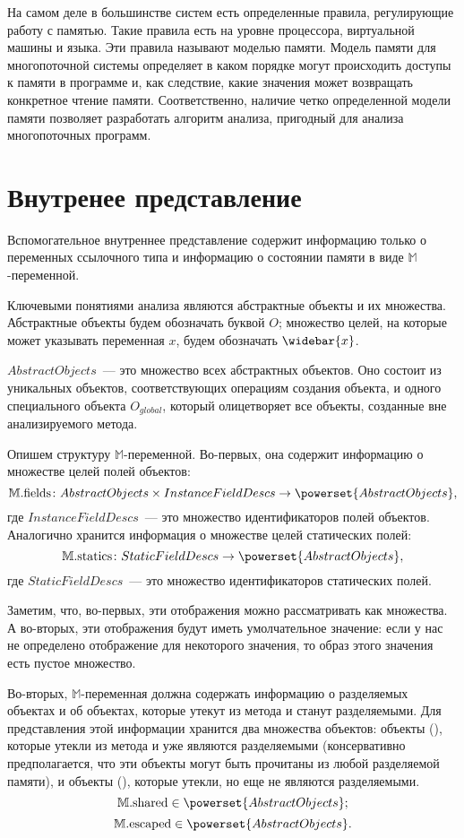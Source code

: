 \documentclass[14pt,titlepage,draft]{extarticle}
\newcommand{\M}{\mathbb{M}}
\newcommand{\Mhyp}{$\M$\hyp}
\newcommand{\Mfield}[1]{\ensuremath{\mathrm{#1}}}
\newcommand{\pts}[1]{\widebar{#1}}
\begin{document}
    На самом деле в большинстве систем есть определенные правила,
    регулирующие работу с памятью. Такие правила есть на уровне процессора,
    виртуальной машины и языка. Эти правила называют моделью памяти.
    Модель памяти для многопоточной системы определяет в каком
    порядке могут происходить доступы к памяти в программе и, как следствие,
    какие значения может возвращать конкретное чтение памяти. Соответственно,
    наличие четко определенной модели памяти позволяет разработать алгоритм
    анализа, пригодный для анализа многопоточных программ.

  \section{Внутренее представление}

    Вспомогательное внутреннее представление содержит информацию только о
    переменных ссылочного типа и информацию о состоянии памяти в виде
    \Mhyp переменной.

    Ключевыми понятиями анализа являются абстрактные объекты и их множества.
    Абстрактные объекты будем обозначать буквой $O$; множество целей, на
    которые может указывать переменная $x$, будем обозначать $\pts{x}$.

    $AbstractObjects$~--- это множество всех абстрактных объектов. Оно
    состоит из уникальных объектов, соответствующих операциям создания объекта,
    и одного специального объекта $O_{global}$, который олицетворяет все
    объекты, созданные вне анализируемого метода.

    Опишем структуру \Mhyp{}переменной. Во\hyp{}первых, она содержит информацию о
    множестве целей полей объектов:
    \[ \M.\Mfield{fields}\colon
      AbstractObjects \times InstanceFieldDescs \to
      \powerset{AbstractObjects},
    \]
    где $InstanceFieldDescs$~--- это множество идентификаторов полей объектов.
    Аналогично хранится информация о множестве целей статических полей:
    \[ \M.\Mfield{statics}\colon
      StaticFieldDescs \to \powerset{AbstractObjects},
    \]
    где $StaticFieldDescs$~--- это множество идентификаторов
    статических полей.

    Заметим, что, во-первых, эти отображения можно рассматривать как множества.
    А во-вторых, эти отображения будут иметь умолчательное значение: если у нас
    не определено отображение для некоторого значения, то образ этого значения
    есть пустое множество.

    Во-вторых, \Mhyp переменная должна содержать информацию о разделяемых
    объектах и об объектах, которые утекут  из метода и станут
    разделяемыми. Для представления этой информации хранится два множества
    объектов: объекты (), которые утекли из метода и уже являются
    разделяемыми (консервативно предполагается, что эти объекты могут быть
    прочитаны из любой разделяемой памяти), и объекты (), которые
    утекли, но еще не являются разделяемыми.
    \[ \M.\Mfield{shared} \in \powerset{AbstractObjects}; \]
    \[ \M.\Mfield{escaped} \in \powerset{AbstractObjects}. \]
\end{document}
